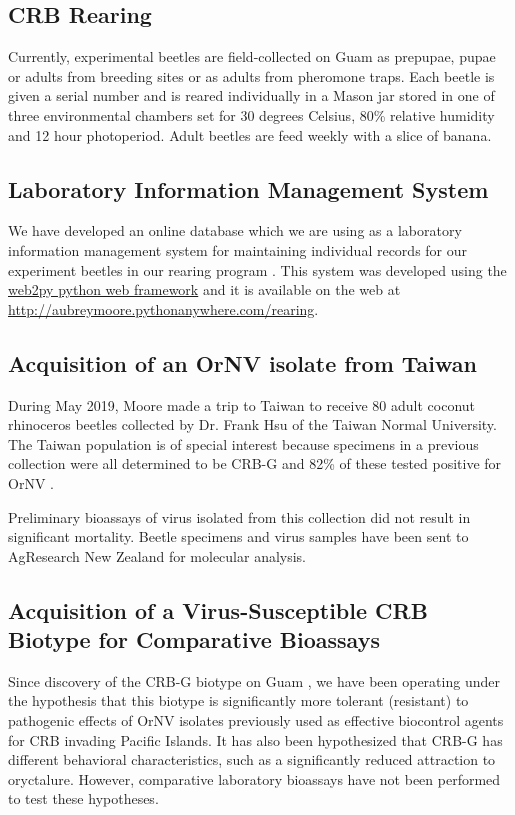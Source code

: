 \documentclass[12pt,letterpaper,english,bibliography=totocnumbered]{scrartcl}
\begin{document}
\clearpage
\subsection{CRB Rearing}

Currently, experimental beetles are field-collected on Guam as prepupae, pupae or adults from breeding sites or as adults from pheromone traps.  Each beetle is given a serial number and is reared individually in a Mason jar stored in one of three environmental chambers set for 30 degrees Celsius, 80\% relative humidity and 12 hour photoperiod. Adult beetles are feed weekly with a slice of banana. 

\subsection{Laboratory Information Management System}\label{lims}

We have developed an online database which we are using as a laboratory information management system for maintaining individual records for our experiment beetles in our rearing program \cite{moore_coconut_2019-1}. This system was developed using the \href{http://www.web2py.com/}{web2py python web framework} and it is available on the web at \url{http://aubreymoore.pythonanywhere.com/rearing}. 

\subsection{Acquisition of an OrNV isolate from Taiwan}

During May 2019, Moore made a trip to Taiwan to receive 80 adult coconut rhinoceros
beetles collected by Dr. Frank Hsu of the Taiwan Normal University. The Taiwan population is of special interest because specimens in a previous collection
were all determined to be CRB-G and 82\% of these tested positive for OrNV \cite{watanabe_survey_2016-1}.

Preliminary bioassays of virus isolated from this collection did not result in significant mortality. Beetle specimens and virus samples have been sent to AgResearch New Zealand for molecular analysis.

\subsection{Acquisition of a Virus-Susceptible CRB Biotype for Comparative Bioassays}

Since discovery of the CRB-G biotype on Guam \cite{marshall_new_2017-1}, we have been operating under the hypothesis that this biotype is significantly more tolerant (resistant) to pathogenic effects of OrNV isolates previously used as effective biocontrol agents for CRB invading Pacific Islands. It has also been hypothesized that CRB-G has different behavioral characteristics, such as a significantly reduced attraction to oryctalure. However, comparative laboratory bioassays have not been performed to test these hypotheses.
\end{document}
